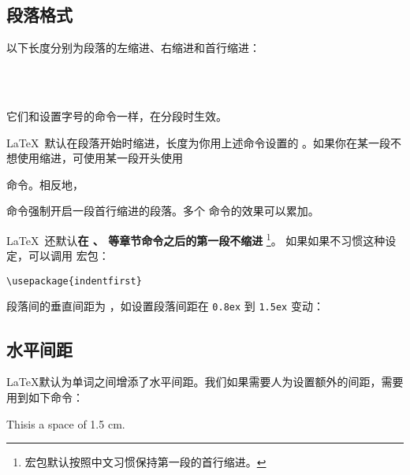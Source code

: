 \subsection{段落格式}\label{subsec:par-shape}

以下长度分别为段落的左缩进、右缩进和首行缩进：
\begin{command}
\marg*{20pt}  \\
\marg*{20pt} \\
\marg*{2em}
\end{command}

它们和设置字号的命令一样，在分段时生效。

\LaTeX\ 默认在段落开始时缩进，长度为你用上述命令设置的 。如果你在某一段不想使用缩进，可使用某一段开头使用
\begin{command}
\end{command}
命令。相反地，
\begin{command}
\end{command}
命令强制开启一段首行缩进的段落。多个  命令的效果可以累加。

\LaTeX\ 还默认\textbf{在 、 等章节命令之后的第一段不缩进}%
\footnote{ 宏包默认按照中文习惯保持第一段的首行缩进。}。
如果如果不习惯这种设定，可以调用  宏包：
\begin{verbatim}
\usepackage{indentfirst}
\end{verbatim}

段落间的垂直间距为 ，如设置段落间距在 \texttt{0.8ex} 到 \texttt{1.5ex} 变动：
\begin{command}
\end{command}

\subsection{水平间距}\label{subsec:hspace}

\LaTeX 默认为单词之间增添了水平间距。我们如果需要人为设置额外的间距，需要用到如下命令：
\begin{command}
\end{command}
\begin{example}
This\hspace{1.5cm}is a space
of 1.5 cm.
\end{example}

